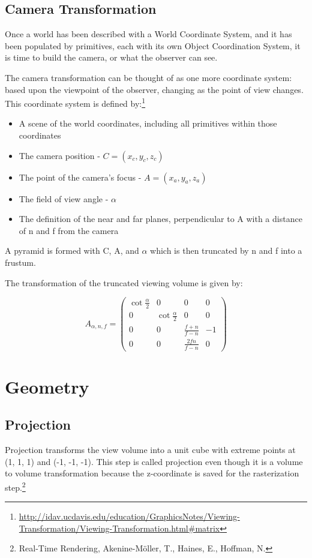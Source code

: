 \documentclass{article}
\begin{document}
\subsection{Camera Transformation}
Once a world has been described with a World Coordinate System, and it has been populated by primitives, each with its own Object Coordination System, it is time to build the camera, or what the observer can see.

The camera transformation can be thought of as one more coordinate system: based upon the viewpoint of the observer, changing as the point of view changes. This coordinate system is defined  by:\footnote{\url{http://idav.ucdavis.edu/education/GraphicsNotes/Viewing-Transformation/Viewing-Transformation.html\#matrix}}

\begin{itemize}
\item A scene of the world coordinates, including all primitives within those coordinates
\item The camera position - $C = (x_{c}, y_{c}, z_{c})$
\item The point of the camera's focus - $A = (x_{a}, y_{a}, z_{a})$
\item The field of view angle - $\alpha$
\item The definition of the near and far planes, perpendicular to A with a distance of n and f from the camera
\end{itemize}

A pyramid is formed with C, A, and $\alpha$ which is then truncated by n and f into a frustum.

The transformation of the truncated viewing volume is given by:

\[A_{\alpha, n, f} = 
\begin{pmatrix}
\cot \frac{\alpha}{2} & 0 & 0 & 0 \\
0 & \cot \frac{\alpha}{2} & 0 & 0 \\
0 & 0 & \frac{f+n}{f-n} & -1 \\
0 & 0 & \frac{2fn}{f-n} & 0
\end{pmatrix}\]

\section{Geometry}

\subsection{Projection}
Projection transforms the view volume into a unit cube with extreme points at (1, 1, 1) and (-1, -1, -1). This step is called projection even though it is a volume to volume transformation because the z-coordinate is saved for the rasterization step.\footnote{Real-Time Rendering, Akenine-Möller, T., Haines, E., Hoffman, N.}
\end{document}
